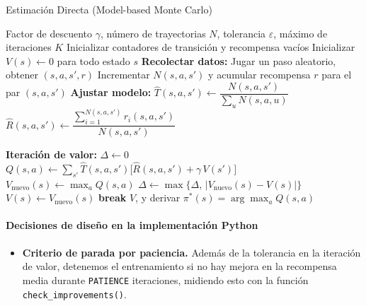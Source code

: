 \begin{algorithm}[H]
\caption{Estimación Directa (Model-based Monte Carlo)}\label{alg:direct-estimation}
\begin{algorithmic}[1]
\Require Factor de descuento $\gamma$, número de trayectorias $N$, tolerancia $\varepsilon$, máximo de iteraciones $K$
\State Inicializar contadores de transición y recompensa vacíos
\State Inicializar $V(s)\gets 0$ para todo estado $s$
  \State \textbf{Recolectar datos:}
    \State Jugar un paso aleatorio, obtener $(s,a,s',r)$
     \State Incrementar $N(s,a,s')$ y acumular recompensa $r$ para el par $(s,a,s')$
  \EndFor
  \State \textbf{Ajustar modelo:}
    \State $\hat T(s,a,s')\gets \dfrac{N(s,a,s')}{\sum_{u}N(s,a,u)}$
    \State $\hat R(s,a,s')\gets \dfrac{\sum_{i=1}^{N(s,a,s')} r_i(s,a,s')}{N(s,a,s')}$

  \EndFor
  \State \textbf{Iteración de valor:}
  \State $\Delta\gets 0$
      \State $Q(s,a)\gets \sum_{s'}\hat T(s,a,s')\bigl[\hat R(s,a,s')+\gamma\,V(s')\bigr]$
    \EndFor
    \State $V_{\text{nuevo}}(s)\gets \max_a Q(s,a)$
    \State $\Delta\gets \max\{\Delta,\,|V_{\text{nuevo}}(s)-V(s)|\}$
    \State $V(s)\gets V_{\text{nuevo}}(s)$
  \EndFor
  \If{$\Delta<\varepsilon$} \textbf{break} \EndIf
\EndFor
\State \Return $V$, y derivar $\pi^*(s)=\arg\max_a Q(s,a)$
\end{algorithmic}
\end{algorithm}

\paragraph*{Decisiones de diseño en la implementación Python}
\begin{itemize}
  \item \textbf{Criterio de parada por paciencia.} Además de la tolerancia en la iteración de valor, detenemos el entrenamiento si no hay mejora en la recompensa media durante \texttt{PATIENCE} iteraciones, midiendo esto con la función \texttt{check\_improvements()}.
\end{itemize}
